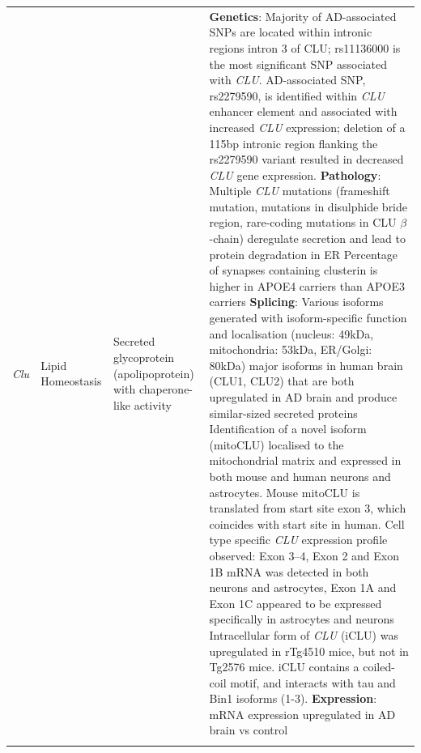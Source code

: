 \begin{changemargin}{1.5cm}
\begin{landscape}
\begin{longtable}[c]{p{1cm}p{2cm}p{4cm}p{19cm}}
			\centering \textit{Clu} &
			\centering Lipid Homeostasis  &
			\centering Secreted glycoprotein (apolipoprotein) with chaperone-like activity  &	
			\tabitem \textbf{Genetics}: Majority of AD-associated SNPs are located within intronic regions intron 3 of CLU; rs11136000 is the most significant SNP associated with \textit{CLU}. \newline 
			\tabitem AD-associated SNP, rs2279590, is identified within \textit{CLU} enhancer element and associated with increased \textit{CLU} expression; deletion of a 115bp intronic region flanking the rs2279590 variant resulted in decreased \textit{CLU} gene expression. \cite{Padhy2017}	\newline 	
			\tabitem \textbf{Pathology}: Multiple \textit{CLU} mutations (frameshift mutation, mutations in disulphide bride region, rare-coding mutations in CLU $\beta$-chain) deregulate secretion and lead to protein degradation in ER\cite{Bettens2015} \newline 
			\tabitem Percentage of synapses containing clusterin is higher in APOE4 carriers than APOE3 carriers\cite{Jackson2019} \newline 
			\tabitem \textbf{Splicing}: Various isoforms generated with isoform-specific function and localisation (nucleus: 49kDa, mitochondria: 53kDa, ER/Golgi: 80kDa)
			\tabitem 2 major isoforms in human brain (CLU1, CLU2) that are both upregulated in AD brain and produce similar-sized secreted proteins\cite{Ling2012}\newline 
			\tabitem Identification of a novel isoform (mitoCLU) localised to the mitochondrial matrix and expressed in both mouse and human neurons and astrocytes. Mouse mitoCLU is translated from start site exon 3, which coincides with start site in human. \newline 
			\tabitem Cell type specific \textit{CLU} expression profile observed: Exon 3–4, Exon 2 and Exon 1B mRNA was detected in both neurons and astrocytes, Exon 1A and Exon 1C appeared to be expressed specifically in astrocytes and neurons\cite{Herring2019} \newline 
			\tabitem Intracellular form of \textit{CLU} (iCLU) was upregulated in rTg4510 mice, but not in Tg2576 mice. iCLU contains a coiled-coil motif, and interacts with tau and Bin1 isoforms (1-3).\cite{Zhou2014} \newline 
			\tabitem \textbf{Expression}: mRNA expression upregulated in AD brain vs control\cite{Karch2012} \\
			\hdashline[0.5pt/5pt]	
			

\end{longtable}
\end{landscape}
\end{changemargin}
